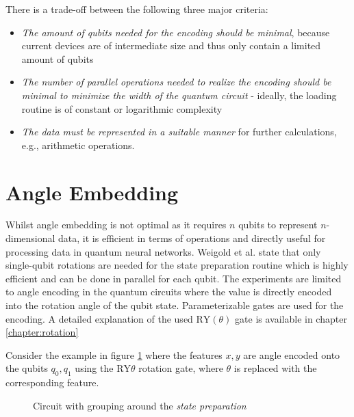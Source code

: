 There is a trade-off between the following three major criteria\cite{Weigold2021_ExpandingDataEncodingPatterns}:
\begin{itemize}
    \item \textit{The amount of qubits needed for the encoding should be minimal}, because current devices are of intermediate size and thus only contain a limited amount of qubits
    \item \textit{The number of parallel operations needed to realize the encoding should be minimal to minimize the width of the quantum circuit} - ideally, the loading routine is of constant or logarithmic complexity
    \item \textit{The data must be represented in a suitable manner} for further calculations, e.g., arithmetic operations.
\end{itemize}


\section{Angle Embedding}\label{section:angle_embedding}


Whilst angle embedding is not optimal as it requires $n$ qubits to represent $n$-dimensional data, it is efficient in terms of operations and directly useful for processing data in quantum neural networks\cite{Weigold2021_ExpandingDataEncodingPatterns,leymannBitterTruthGatebased2020}. Weigold et al.  state that only single-qubit rotations are needed for the state preparation routine which is highly efficient and can be done in parallel for each qubit. \break{}
The experiments are limited to angle encoding in the quantum circuits where the value is directly encoded into the rotation angle of the qubit state. Parameterizable gates\cite{qiskit_rygate_nodate} are used for the encoding. A detailed explanation of the used $\mathrm{RY}(\theta)$ gate is available in chapter \ref{chapter:rotation} \break{}
 
Consider the example in figure \ref{fig:example_encoding_circuit_ry} where the features $x, y$ are angle encoded onto the qubits $q_0, q_1$ using the $\mathrm{RY}\theta$ rotation gate, where $\theta$ is replaced with the corresponding feature. 

\begin{figure}[!h]
    \centering
    \caption{Circuit with grouping around the \textit{state preparation}}
    \label{fig:example_encoding_circuit_ry}
\end{figure}

